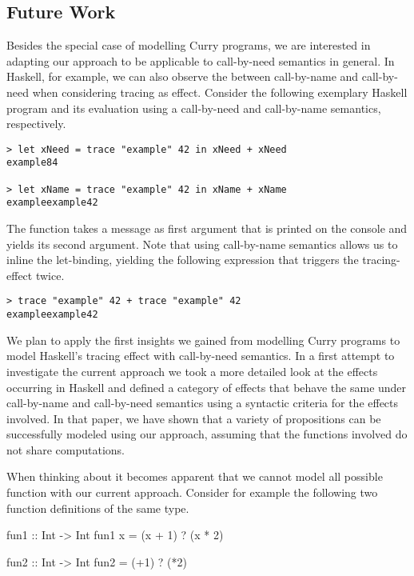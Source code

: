 \subsection{Future Work}
Besides the special case of modelling Curry programs, we are interested in adapting our approach to be applicable to call-by-need semantics in general.
In Haskell, for example, we can also observe the  between call-by-name and call-by-need when considering tracing as effect.
Consider the following exemplary Haskell program and its evaluation using a call-by-need and call-by-name semantics, respectively.

\begin{verbatim}
> let xNeed = trace "example" 42 in xNeed + xNeed
example84

> let xName = trace "example" 42 in xName + xName
exampleexample42
\end{verbatim}

The function  takes a message as first argument that is printed on the console and yields its second argument.
Note that using call-by-name semantics allows us to inline the let-binding, yielding the following expression that triggers the tracing-effect twice.

\begin{verbatim}
> trace "example" 42 + trace "example" 42
exampleexample42
\end{verbatim}

We plan to apply the first insights we gained from modelling Curry programs to model Haskell's tracing effect with call-by-need semantics.
In a first attempt to investigate the current approach \citep{christiansen2019verifying} we took a more detailed look at the effects occurring in Haskell and defined a category of effects that behave the same under call-by-name and call-by-need semantics using a syntactic criteria for the effects involved.
In that paper, we have shown that a variety of propositions can be successfully modeled using our approach, assuming that the functions involved do not share computations.

When thinking about it becomes apparent that we cannot model all possible function with our current approach.
Consider for example the following two function definitions of the same type.

\begin{curry}
fun1 :: Int -> Int
fun1 x = (x + 1) ? (x * 2)

fun2 :: Int -> Int
fun2 = (+1) ? (*2)
\end{curry}

